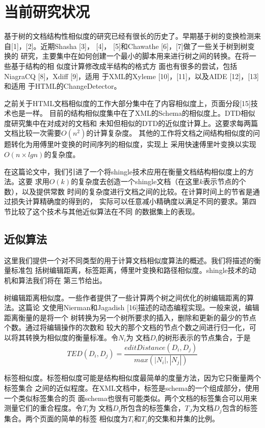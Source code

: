 \section{当前研究状况}
基于树的文档结构性相似度的研究已经有很长的历史了。早期基于树的变换检测来
自[1]，[2]。近期Shasha [3]， [4]， [5]和Chawathe [6]，[7]做了一些关于树到树变换的
研究，主要集中在如何创建一个最小的脚本用来进行树之间的转换。在将一些基于结构的相
似度计算修改成半结构的格式方
面也有很多的尝试，包括NiagraCQ [8]，Xdiff [9]，适用
于XML的Xyleme [10]，[11]，以及AIDE [12]，[13]和适用
于HTML的ChangeDetector\textsuperscript{\texttrademark}。

之前关于HTML文档相似度的工作大部分集中在了内容相似度上，页面分段[15]技术也是一样。
目前的结构相似度集中在了XML的Schema的相似度上。DTD相似度研究集中在对成对的文档和
未知但相似的DTD的近似度计算上。这要求每两篇文档比较一次需要$O(n^2)$的计算复杂度。
其他的工作将文档之间结构相似度的问题转化为用傅里叶变换的时间序列的相似度，实现上
采用快速傅里叶变换以实现$O(n\times lgn)$的复杂度。

在这篇论文中，我们引进了一个将shingle技术应用在衡量文档结构相似度上的方法。这要
求用$O(k)$的复杂度去创造一个shingle文档（在这里$k$表示节点的个数），以及提供常数
时间的复杂度进行文档之间的比较。在计算时间上的节省是通过损失计算精确度的得到的，
实际可以任意减小精确度以满足不同的要求。第四节比较了这个技术与其他近似算法在不同
的数据集上的表现。

\subsection{近似算法}
这里我们提供一个对不同类型的用于计算文档相似度算法的概述。我们将描述的衡量标准包
括树编辑距离，标签距离，傅里叶变换和路径相似度。shingle技术的动机和算法我们将在
第三节给出。

树编辑距离相似度。一些作者提供了一些计算两个树之间优化的树编辑距离的算法。这篇论
文使用Nierman和Jagadish [16]描述的动态编程实现。一般来说，编辑距离衡量的是将一个
树转换为另一个树所要求的插入，删除和更新的最少的节点个数。通过将编辑操作的次数和
较大的那个文档的节点个数之间进行归一化，可以将其转换为相似度的衡量标准。令$N_i$为
文档$D_i$的树形表示的节点集合，于是
\[
TED(D_i,D_j)=\frac{editDistance(D_i,D_j)}{max(|N_i|,|N_j|)}
\]

标签相似度。标签相似度可能是结构相似度最简单的度量方法，因为它只衡量两个标签集合
之间的近似程度。在XML文档中，标签是schema的一个组成部分，使用一个类似标签集合的页
面schema也很有可能类似。两个文档的标签集合可以用来测量它们的重合程度。令$T_i$为
文档$D_i$所包含的标签集合，$T_J$为文档$D_j$包含的标签集合。两个页面的简单的标签
相似度为$T_i$和$T_j$的交集和并集的比例。

